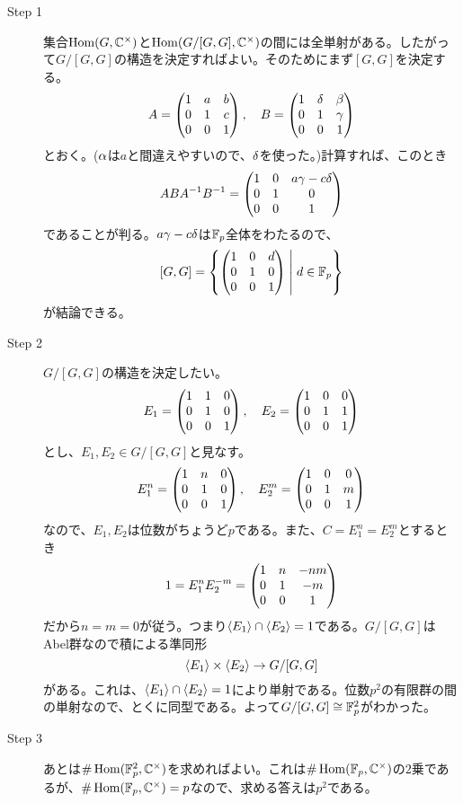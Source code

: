 \begin{sol} ${}$
  \begin{description}
    \item[Step 1] 集合$\operatorname{Hom}(G, {\mathbb C}^{\times})$と$\operatorname{Hom}(G/[G,G], {\mathbb C}^{\times})$の間には全単射がある。したがって$G/[G,G]$の構造を決定すればよい。そのためにまず$[G,G]$を決定する。
    \[
    A = \begin{pmatrix} 1 & a & b \\ 0 & 1 & c \\ 0 & 0 & 1 \end{pmatrix},  \quad B = \begin{pmatrix} 1 & {\delta} & \beta \\ 0 & 1 & {\gamma} \\ 0 & 0 & 1 \end{pmatrix}
    \]
    とおく。(${\alpha}$は$a$と間違えやすいので、${\delta}$を使った。)計算すれば、このとき
    \begin{align*}
    ABA^{-1}B^{-1} = \begin{pmatrix} 1 & 0  & a {\gamma} - c {\delta} \\ 0 & 1 & 0 \\ 0 & 0 & 1  \end{pmatrix} \\
  \end{align*}
  であることが判る。$a {\gamma} - c {\delta}$は${\mathbb F}_p$全体をわたるので、
  \[
  [G,G] = \left\{  \begin{pmatrix} 1 & 0 & d \\ 0 & 1 & 0 \\ 0 & 0 & 1 \end{pmatrix}  \mathrel{} \middle| \mathrel{} d \in {\mathbb F}_p  \right\}
  \]
  が結論できる。
  \item[Step 2] $G/[G,G]$の構造を決定したい。
  \[
  E_1 = \begin{pmatrix} 1 & 1 & 0 \\ 0 & 1 & 0 \\ 0 & 0 & 1 \end{pmatrix}, \quad E_2 =  \begin{pmatrix} 1 & 0 & 0 \\ 0 & 1 & 1 \\ 0 & 0 & 1 \end{pmatrix}
  \]
  とし、$E_1, E_2 \in G/ [G,G]$と見なす。
  \[
  E_1^n = \begin{pmatrix} 1 & n & 0 \\ 0 & 1 & 0 \\ 0 & 0 & 1 \end{pmatrix}, \quad E_2^m =  \begin{pmatrix} 1 & 0 & 0 \\ 0 & 1 & m \\ 0 & 0 & 1 \end{pmatrix}
  \]
  なので、$E_1, E_2$は位数がちょうど$p$である。また、$C = E_1^n = E_2^m$とするとき
  \[
  1 = E_1^n E_2^{-m} = \begin{pmatrix}  1 & n & -nm \\ 0 & 1 & -m \\ 0 & 0 & 1 \end{pmatrix}
  \]
  だから$n=m=0$が従う。つまり$\langle E_1 \rangle \cap \langle E_2 \rangle = 1$である。$G/[G,G]$はAbel群なので積による準同形
  \[
  \langle E_1 \rangle \times \langle E_2 \rangle \to G/[G,G]
  \]
  がある。これは、$\langle E_1 \rangle \cap \langle E_2 \rangle = 1$により単射である。位数$p^2$の有限群の間の単射なので、とくに同型である。よって$G/[G,G] \cong {\mathbb F}_p^2$がわかった。
  \item[Step 3] あとは$\# \operatorname{Hom}({\mathbb F}_p^2, {\mathbb C}^{\times})$を求めればよい。これは$\# \operatorname{Hom}({\mathbb F}_p,{\mathbb C}^{\times})$の$2$乗であるが、$\# \operatorname{Hom}({\mathbb F}_p,{\mathbb C}^{\times}) = p$なので、求める答えは$p^2$である。
  \end{description}
\end{sol}

